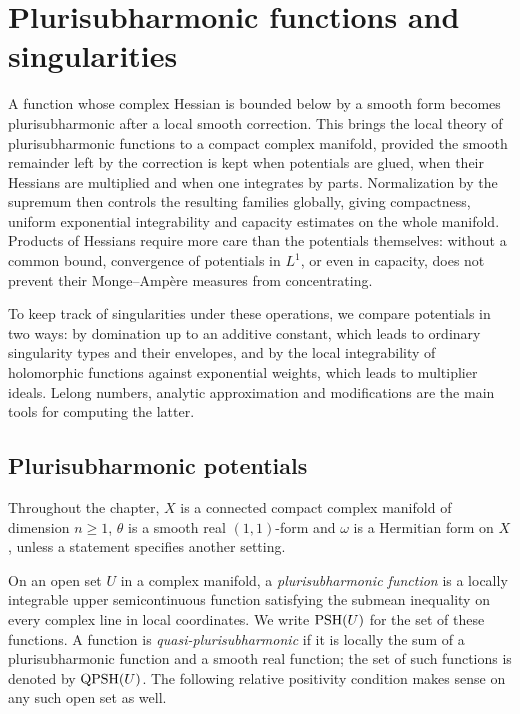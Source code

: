 \chapter{Plurisubharmonic functions and singularities}
\label{chap:framework}

A function whose complex Hessian is bounded below by a smooth form becomes plurisubharmonic after a local smooth correction. This brings the local theory of plurisubharmonic functions to a compact complex manifold, provided the smooth remainder left by the correction is kept when potentials are glued, when their Hessians are multiplied and when one integrates by parts. Normalization by the supremum then controls the resulting families globally, giving compactness, uniform exponential integrability and capacity estimates on the whole manifold. Products of Hessians require more care than the potentials themselves: without a common bound, convergence of potentials in $L^1$, or even in capacity, does not prevent their Monge--Amp\`ere measures from concentrating.

To keep track of singularities under these operations, we compare potentials in two ways: by domination up to an additive constant, which leads to ordinary singularity types and their envelopes, and by the local integrability of holomorphic functions against exponential weights, which leads to multiplier ideals. Lelong numbers, analytic approximation and modifications are the main tools for computing the latter.

\section{Plurisubharmonic potentials}

Throughout the chapter, $X$ is a connected compact complex manifold of dimension $n\geq1$, $\theta$ is a smooth real $(1,1)$-form and $\omega$ is a Hermitian form on $X$, unless a statement specifies another setting.

On an open set $U$ in a complex manifold, a \emph{plurisubharmonic function} is a locally integrable upper semicontinuous function satisfying the submean inequality on every complex line in local coordinates. We write $\mathrm{PSH}(U)$ for the set of these functions. A function is \emph{quasi-plurisubharmonic} if it is locally the sum of a plurisubharmonic function and a smooth real function; the set of such functions is denoted by $\mathrm{QPSH}(U)$. The following relative positivity condition makes sense on any such open set as well.

